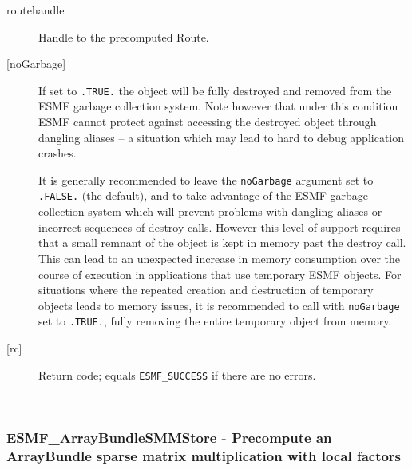      \begin{description}
     \item [routehandle]
       Handle to the precomputed Route.
     \item[{[noGarbage]}]
       If set to {\tt .TRUE.} the object will be fully destroyed and removed
       from the ESMF garbage collection system. Note however that under this 
       condition ESMF cannot protect against accessing the destroyed object 
       through dangling aliases -- a situation which may lead to hard to debug 
       application crashes.
   
       It is generally recommended to leave the {\tt noGarbage} argument
       set to {\tt .FALSE.} (the default), and to take advantage of the ESMF 
       garbage collection system which will prevent problems with dangling
       aliases or incorrect sequences of destroy calls. However this level of
       support requires that a small remnant of the object is kept in memory
       past the destroy call. This can lead to an unexpected increase in memory
       consumption over the course of execution in applications that use 
       temporary ESMF objects. For situations where the repeated creation and 
       destruction of temporary objects leads to memory issues, it is 
       recommended to call with {\tt noGarbage} set to {\tt .TRUE.}, fully 
       removing the entire temporary object from memory.
     \item [{[rc]}]
       Return code; equals {\tt ESMF\_SUCCESS} if there are no errors.
     \end{description}
   
 
\mbox{}\hrulefill\ 
 
\subsubsection [ESMF\_ArrayBundleSMMStore] {ESMF\_ArrayBundleSMMStore - Precompute an ArrayBundle sparse matrix multiplication with local factors}


